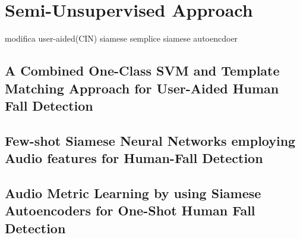 \chapter{Semi-Unsupervised Approach}
 modifica user-aided(CIN)
siamese semplice
siamese autoencdoer

\section{A Combined One-Class SVM and Template Matching Approach for User-Aided Human Fall Detection}
\section{Few-shot Siamese Neural Networks employing Audio features
for Human-Fall Detection}
\section{Audio Metric Learning by using Siamese Autoencoders
for One-Shot Human Fall Detection}